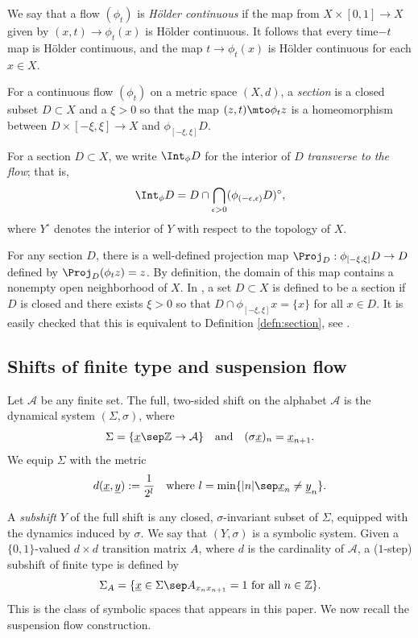 We say that a flow $(\phi_t)$ is \emph{Hölder continuous} if the map from $X \times [0,1] \to X$ given by $(x,t) \to \phi_t(x)$ is Hölder continuous. It follows that every time$-t$ map is Hölder continuous, and the map $t \to \phi_t(x)$ is Hölder continuous for each $x\in X$.

\begin{defn}\label{defn:section}
For a continuous flow $( \phi_t )$ on a metric space $(X,d)$, a \emph{section} is a closed subset $D\subset X$ and a $\xi>0$ so that the map $(z,t) \mto \phi_tz$ is a homeomorphism between $D \times [-\xi, \xi] \to X$ and $\phi_{[-\xi,\xi]}D$.
\end{defn}

For a section $D \subset X$, we write $\Int_\phi D$ for the interior of $D$ \emph{transverse to the flow}; that is,
\[\Int_\phi D = D \cap \bigcap_{\epsilon>0}(\phi_{(-\epsilon,\epsilon)}D)^\circ,\]
where $Y^\circ$ denotes the interior of $Y$ with respect to the topology of $X$.

For any section $D$, there is a well-defined projection map $\Proj_D: \phi_{[-\xi,\xi]}D \to D$ defined by $\Proj_D(\phi_tz) =z$. By definition, the domain of this map contains a nonempty open neighborhood of $X$. In \cite{BW}, a set $D \subset X$ is defined to be a section if $D$ is closed and there exists $\xi>0$ so that $D \cap \phi_{[-\xi,\xi]}x = \{x\}$ for all $x \in D$. It is easily checked that this is equivalent to Definition \ref{defn:section}, see \cite[\S 5]{BW}.

\subsection{Shifts of finite type and suspension flow}

Let $\mathcal{A}$ be any finite set. The full, two-sided shift on the alphabet $\mathcal{A}$ is the dynamical system $(\Sigma, \sigma)$, where
\[ \Sigma = \{ \underline x\sep \mathbb{Z} \to \mathcal{A} \} \quad \mbox{and} \quad (\sigma \underline x)_n = \underline x_{n+1}. \]
We equip $\Sigma$ with the metric
\[ d(\underline x, \underline y) := \frac{1}{2^l} \quad \mbox{where } l = \min\{|n|\sep\underline x_n \neq \underline y_n\}. \]

A \emph{subshift} $Y$ of the full shift is any closed, $\sigma$-invariant subset of $\Sigma$, equipped with the dynamics induced by $\sigma$. We say that $(Y, \sigma)$ is a symbolic system. Given a $\{0,1\}$-valued $d \times d $ transition matrix $A$, where $d$ is the cardinality of $\mathcal{A}$, a ($1$-step) subshift of finite type is defined by
\[
\Sigma_A = \{\underline x \in \Sigma \sep A_{x_n x_{n+1}}=1 \mbox{ for all } n\in \mathbb{Z}\}.
\]
This is the class of symbolic spaces that appears in this paper. We now recall the suspension flow construction.

